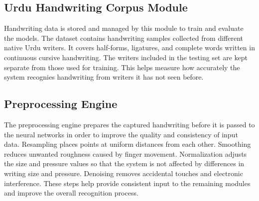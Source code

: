 \documentclass[12pt,a4paper]{report}
\begin{document}
\subsection{Urdu Handwriting Corpus Module}
Handwriting data is stored and managed by this module to train and evaluate the models. The dataset contains handwriting samples collected from different native Urdu writers. It covers half-forms, ligatures, and complete words written in continuous cursive handwriting. The writers included in the testing set are kept separate from those used for training. This helps measure how accurately the system recognies handwriting from writers it has not seen before. 

\subsection{Preprocessing Engine}
The preprocessing engine prepares the captured handwriting before it is passed to the neural networks in order to improve the quality and consistency of input data. Resampling places points at uniform distances from each other. Smoothing reduces unwanted roughness caused by finger movement. Normalization adjusts the size and pressure values so that the system is not affected by differences in writing size and pressure. Denoising removes accidental touches and electronic interference. These steps help provide consistent input to the remaining modules and improve the overall recognition process.
\end{document}
